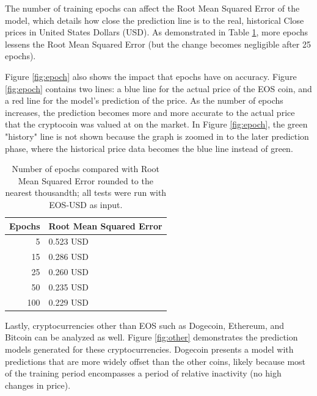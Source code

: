 The number of training epochs can affect the Root Mean Squared Error
of the model, which details how close the prediction line is to the
real, historical Close prices in United States Dollars (USD). As
demonstrated in Table \ref{tab:epochvsrmse}, more epochs lessens the
Root Mean Squared Error (but the change becomes negligible after 25
epochs).

Figure \ref{fig:epoch} also shows the impact that epochs have on
accuracy. Figure \ref{fig:epoch} contains two lines: a blue line for
the actual price of the EOS coin, and a red line for the model's
prediction of the price. As the number of epochs increases, the
prediction becomes more and more accurate to the actual price that the
cryptocoin was valued at on the market. In Figure \ref{fig:epoch}, the
green "history" line is not shown because the graph is zoomed in to
the later prediction phase, where the historical price data becomes
the blue line instead of green.

\begin{table}[htb]

  \caption{Number of epochs compared with Root Mean Squared Error
    rounded to the nearest thousandth; all tests were run with EOS-USD
    as input.}

\label{tab:epochvsrmse}
\begin{tabular}{rl}
Epochs &   Root Mean Squared Error   \\
\hline
 5      & 0.523 USD              \\
 15     & 0.286 USD              \\
 25     & 0.260 USD              \\
 50     & 0.235 USD              \\
 100    & 0.229 USD              \\
\hline
\end{tabular}
\end{table}

Lastly, cryptocurrencies other than EOS such as Dogecoin, Ethereum,
and Bitcoin can be analyzed as well. Figure \ref{fig:other}
demonstrates the prediction models generated for these
cryptocurrencies. Dogecoin presents a model with predictions that are
more widely offset than the other coins, likely because most of the
training period encompasses a period of relative inactivity (no high
changes in price).


